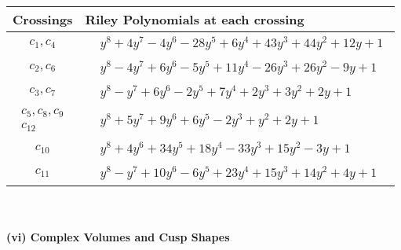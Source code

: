 \documentclass[1p]{elsarticle_modified}
\theoremstyle{definition}
\begin{document}
\begin{tabular}{m{50pt}|m{274pt}}
Crossings & \hspace{64pt}Riley Polynomials at each crossing \\
\hline $$\begin{aligned}c_{1},c_{4}\end{aligned}$$&$\begin{aligned}
&y^8+4 y^7-4 y^6-28 y^5+6 y^4+43 y^3+44 y^2+12 y+1
\end{aligned}$\\
\hline $$\begin{aligned}c_{2},c_{6}\end{aligned}$$&$\begin{aligned}
&y^8-4 y^7+6 y^6-5 y^5+11 y^4-26 y^3+26 y^2-9 y+1
\end{aligned}$\\
\hline $$\begin{aligned}c_{3},c_{7}\end{aligned}$$&$\begin{aligned}
&y^8- y^7+6 y^6-2 y^5+7 y^4+2 y^3+3 y^2+2 y+1
\end{aligned}$\\
\hline $$\begin{aligned}c_{5},c_{8},c_{9}\\c_{12}\end{aligned}$$&$\begin{aligned}
&y^8+5 y^7+9 y^6+6 y^5-2 y^3+y^2+2 y+1
\end{aligned}$\\
\hline $$\begin{aligned}c_{10}\end{aligned}$$&$\begin{aligned}
&y^8+4 y^6+34 y^5+18 y^4-33 y^3+15 y^2-3 y+1
\end{aligned}$\\
\hline $$\begin{aligned}c_{11}\end{aligned}$$&$\begin{aligned}
&y^8- y^7+10 y^6-6 y^5+23 y^4+15 y^3+14 y^2+4 y+1
\end{aligned}$\\
\hline
\end{tabular}\\~\\
\newpage\flushleft \textbf{(vi) Complex Volumes and Cusp Shapes}
\end{document}
